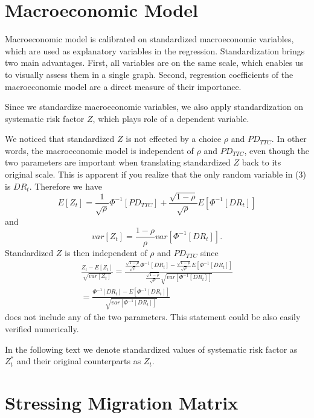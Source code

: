 \documentclass[a4paper]{article}
\begin{document}
\section{Macroeconomic Model}

Macroeconomic model is calibrated on standardized macroeconomic variables, which are used as explanatory variables in the regression. Standardization brings two main advantages. First, all variables are on the same scale, which enables us to visually assess them in a single graph. Second, regression coefficients of the macroeconomic model are a direct measure of their importance.

Since we standardize macroeconomic variables, we also apply standardization on systematic risk factor $Z$, which plays role of a dependent variable.

We noticed that standardized $Z$ is not effected by a choice $\rho$ and $PD_{TTC}$. In other words, the macroeconomic model is independent of $\rho$ and $PD_{TTC}$, even though the two parameters are important when translating standardized $Z$ back to its original scale. This is apparent if you realize that the only random variable in (3) is $DR_t$. Therefore we have
\begin{equation}
E[Z_t] = \frac{1}{\sqrt{\rho}}\Phi^{-1}[PD_{TTC}] + \frac{\sqrt{1-\rho}}{\sqrt{\rho}}E[\Phi^{-1}[DR_t]]
\end{equation}
and
\begin{equation}
var[Z_t] = \frac{1 - \rho}{\rho}var[\Phi^{-1}[DR_t]].
\end{equation}
Standardized $Z$ is then independent of $\rho$ and $PD_{TTC}$ since
\begin{multline}
\frac{Z_t - E[Z_t]}{\sqrt{var[Z_t]}} = \frac{\frac{\sqrt{1-\rho}}{\sqrt{\rho}}\Phi^{-1}[DR_t] - \frac{\sqrt{1-\rho}}{\sqrt{\rho}}E[\Phi^{-1}[DR_t]]}{\frac{\sqrt{1 - \rho}}{\sqrt{\rho}}\sqrt{var[\Phi^{-1}[DR_t]]}}\\
= \frac{\Phi^{-1}[DR_t] - E[\Phi^{-1}[DR_t]]}{\sqrt{var[\Phi^{-1}[DR_t]]}}
\end{multline}
does not include any of the two parameters. This statement could be also easily verified numerically.

In the following text we denote standardized values of systematic risk factor as $Z^*_t$ and their original counterparts as $Z_t$.

\section{Stressing Migration Matrix}
\end{document}
